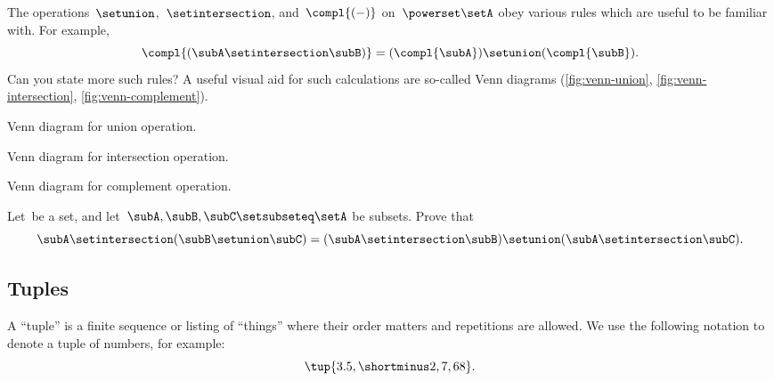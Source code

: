 The operations~$\setunion$,~$\setintersection$, and~$\compl{( - )}$ on~$\powerset \setA$ obey various rules which are useful to be familiar with.
For example,
\begin{equation}
    \compl{(\subA \setintersection \subB)} = (\compl{\subA}) \setunion (\compl{\subB}).
\end{equation}
Can you state more such rules?
A useful visual aid for such calculations are so-called Venn diagrams (\cref{fig:venn-union}, \cref{fig:venn-intersection}, \cref{fig:venn-complement}).

\begin{marginfigure}
    \centering
    \caption{Venn diagram for union operation.}
    \label{fig:venn-union}
\end{marginfigure}

\begin{marginfigure}
    \centering
    \caption{Venn diagram for intersection operation.}
    \label{fig:venn-intersection}
\end{marginfigure}

\begin{marginfigure}
    \centering
    \caption{Venn diagram for complement operation.}
    \label{fig:venn-complement}
\end{marginfigure}

\begin{gradedexercise}
    \label{ex:distributing-subsets}
    Let~\setA be a set, and let~$\subA, \subB, \subC \setsubseteq \setA$ be subsets.
    Prove that
    \begin{equation}
        \subA \setintersection (\subB \setunion \subC) = (\subA \setintersection \subB) \setunion (\subA \setintersection \subC).
    \end{equation}
\end{gradedexercise}


\subsection{Tuples}
\label{sec:tuples}

A ``tuple'' is a finite sequence or listing of ``things'' where their order matters and repetitions are allowed.
We use the following notation to denote a tuple of numbers, for example:
\begin{equation}
    \tup{3.5, \shortminus 2, 7, 68}.
\end{equation}


